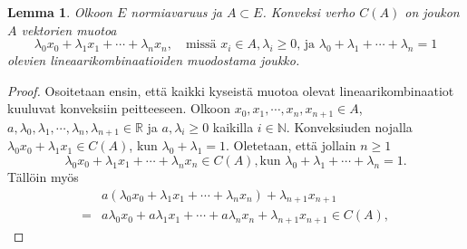 \documentclass[12pt,a4paper,leqno]{report}
\newcommand{\R}{\mathbb{R}}
\newcommand{\N}{\mathbb{N}}
\theoremstyle{plain}
\newtheorem{lem}[equation]{Lemma}
\theoremstyle{definition}
\theoremstyle{remark}
\begin{document}
\begin{lem} Olkoon $E$ normiavaruus ja $A\subset E$. 
Konveksi verho $C(A)$ on joukon $A$ vektorien muotoa $$\lambda_0 x_0+\lambda_1 x_1+\cdots+\lambda_{n} x_{n},\quad\text{missä } x_i\in A, \lambda_i\geq0\text{, ja }\lambda_0+\lambda_1+\cdots+ \lambda_{n} =1$$ olevien lineaarikombinaatioiden muodostama joukko. 
\end{lem}

\begin{proof} Osoitetaan ensin, että kaikki kyseistä muotoa olevat lineaarikombinaatiot kuuluvat konveksiin peitteeseen.
Olkoon $x_0,x_1,\cdots, x_n, x_{n+1} \in A$, $a,\lambda_0,\lambda_1,\cdots, \lambda_n, \lambda_{n+1} \in \R$ ja $a,\lambda_i\geq 0$ kaikilla $ i\in\N$. Konveksiuden nojalla 
$\lambda_0 x_0+\lambda_1 x_1 \in C(A)$, kun $\lambda_0 +\lambda_1=1$.
Oletetaan, että jollain $n\geq 1$ 
\begin{equation*}
\lambda_0 x_0+\lambda_1 x_1+\cdots+\lambda_{n} x_{n}\in C(A), \text{kun } \lambda_0+\lambda_1+\cdots+ \lambda_{n} =1.
 \end{equation*}
Tällöin myös
\begin{equation*}
\begin{split}
&a(\lambda_0 x_0+\lambda_1 x_1+\cdots+\lambda_{n}x_n)+\lambda_{n+1} x_{n+1}\\=&a\lambda_0 x_0+a\lambda_1 x_1+\cdots+a\lambda_{n}x_n+\lambda_{n+1} x_{n+1}
\in C(A),
\end{split}
\end{equation*}

\end{proof}
\end{document}
